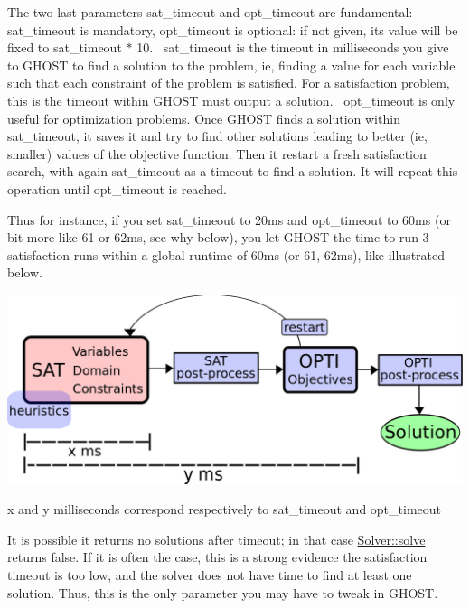 The two last parameters sat\+\_\+timeout and opt\+\_\+timeout are fundamental\+: sat\+\_\+timeout is mandatory, opt\+\_\+timeout is optional\+: if not given, its value will be fixed to sat\+\_\+timeout $\ast$ 10.~\newline
sat\+\_\+timeout is the timeout in milliseconds you give to G\+H\+O\+ST to find a solution to the problem, ie, finding a value for each variable such that each constraint of the problem is satisfied. For a satisfaction problem, this is the timeout within G\+H\+O\+ST must output a solution.~\newline
opt\+\_\+timeout is only useful for optimization problems. Once G\+H\+O\+ST finds a solution within sat\+\_\+timeout, it saves it and try to find other solutions leading to better (ie, smaller) values of the objective function. Then it restart a fresh satisfaction search, with again sat\+\_\+timeout as a timeout to find a solution. It will repeat this operation until opt\+\_\+timeout is reached.

Thus for instance, if you set sat\+\_\+timeout to 20ms and opt\+\_\+timeout to 60ms (or bit more like 61 or 62ms, see why below), you let G\+H\+O\+ST the time to run 3 satisfaction runs within a global runtime of 60ms (or 61, 62ms), like illustrated below.


\begin{DoxyImage}
\includegraphics[width=\textwidth,height=\textheight/2,keepaspectratio=true]{architecture.png}
\caption{x and y milliseconds correspond respectively to sat\+\_\+timeout and opt\+\_\+timeout}
\end{DoxyImage}
 It is possible it returns no solutions after timeout; in that case \hyperlink{classghost_1_1Solver_acc72c5a651e888858c10dfe300d96fa8}{Solver\+::solve} returns false. If it is often the case, this is a strong evidence the satisfaction timeout is too low, and the solver does not have time to find at least one solution. Thus, this is the only parameter you may have to tweak in G\+H\+O\+ST.

